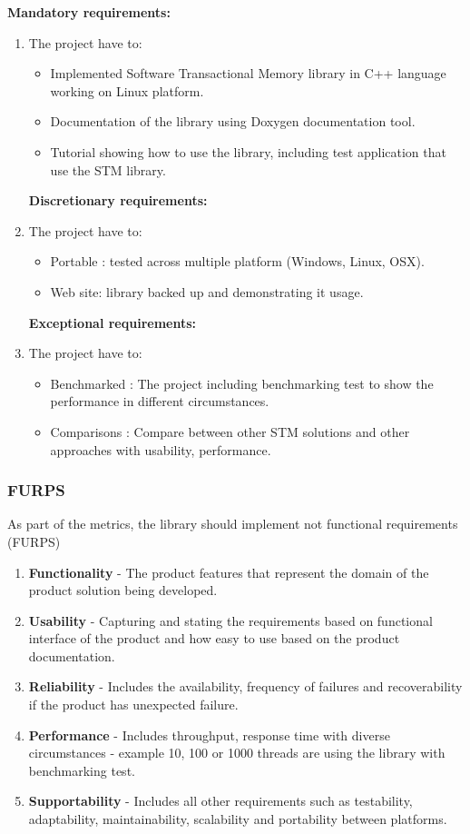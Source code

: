 \documentclass[12pt]{article}
\begin{document}
\textbf{Mandatory requirements:} 
\begin{enumerate}
\item The project have to:
	\begin{itemize}
	\item Implemented Software Transactional Memory library in C++ language working on Linux platform.
	\item Documentation of the library using Doxygen documentation tool.
	\item Tutorial showing how to use the library, including test application that use the STM library.
	\end{itemize}


\textbf{Discretionary requirements:} 

\item The project have to:
	\begin{itemize}
	\item Portable : tested across multiple platform (Windows, Linux, OSX).
	\item Web site: library backed up and demonstrating it usage.
	\end{itemize}

\clearpage
\textbf{Exceptional requirements:} 

\item The project have to:
	\begin{itemize}
	\item Benchmarked : The project including benchmarking test to show the performance in different circumstances.
	\item Comparisons : Compare between other STM solutions and other approaches with usability, performance.
	\end{itemize}
\end{enumerate}

\subsubsection{FURPS}
As part of the metrics, the library should implement not functional requirements (FURPS)\cite{PPTX}
\begin{enumerate}
\item \textbf{Functionality} - The product features that represent the domain of the product solution being developed. 
\item \textbf{Usability} - Capturing and stating the requirements based on functional interface of the product and how easy to use based on the product documentation. 
\item \textbf{Reliability} -  Includes the availability, frequency of failures and recoverability if the product has unexpected failure.
\item \textbf{Performance} - Includes throughput, response time with diverse circumstances - example 10, 100 or 1000 threads are using the library with benchmarking test.
\item \textbf{Supportability} - Includes all other requirements such as 
testability, adaptability, maintainability, scalability and portability between platforms. 
\end{enumerate}
\end{document}
